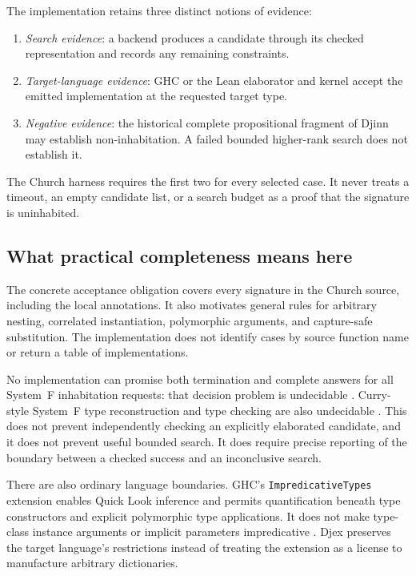 \documentclass[11pt]{article}
\newcommand{\code}[1]{\texttt{#1}}
\begin{document}
The implementation retains three distinct notions of evidence:
\begin{enumerate}
  \item \emph{Search evidence}: a backend produces a candidate through its
    checked representation and records any remaining constraints.
  \item \emph{Target-language evidence}: GHC or the Lean elaborator and kernel
    accept the emitted implementation at the requested target type.
  \item \emph{Negative evidence}: the historical complete propositional
    fragment of Djinn may establish non-inhabitation. A failed bounded
    higher-rank search does not establish it.
\end{enumerate}
The Church harness requires the first two for every selected case. It never
treats a timeout, an empty candidate list, or a search budget as a proof that
the signature is uninhabited.

\subsection{What practical completeness means here}

The concrete acceptance obligation covers every signature in the Church
source, including the local annotations. It also motivates general rules for
arbitrary nesting, correlated instantiation, polymorphic arguments, and
capture-safe substitution. The implementation does not identify cases by
source function name or return a table of implementations.

No implementation can promise both termination and complete answers for all
System~F inhabitation requests: that decision problem is undecidable
\cite{inhabitation}. Curry-style System~F type reconstruction and type checking
are also undecidable \cite{wells}. This does not prevent independently checking
an explicitly elaborated candidate, and it does not prevent useful bounded
search. It does require precise reporting of the boundary between a checked
success and an inconclusive search.

There are also ordinary language boundaries. GHC's
\code{ImpredicativeTypes} extension enables Quick Look inference and permits
quantification beneath type constructors and explicit polymorphic type
applications. It does not make type-class instance arguments or implicit
parameters impredicative \cite{ghc}. Djex preserves the target language's
restrictions instead of treating the extension as a license to manufacture
arbitrary dictionaries.
\end{document}
